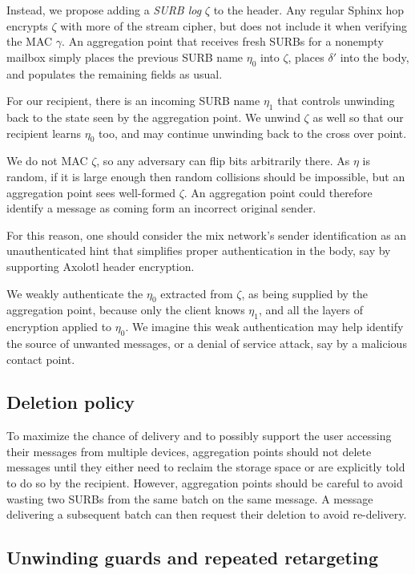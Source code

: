 Instead, we propose adding a {\it SURB log} $\zeta$ to the header.
Any regular Sphinx hop encrypts $\zeta$ with more of the stream
cipher, but does not include it when verifying the MAC $\gamma$.
An aggregation point that receives fresh SURBs for a nonempty
mailbox simply places the previous SURB name $\eta_0$ into $\zeta$,
places $\delta'$ into the body, and populates the remaining fields
as usual.

For our recipient, there is an incoming SURB name $\eta_1$ that 
controls unwinding back to the state seen by the aggregation point.
We unwind $\zeta$ as well so that our recipient learns $\eta_0$ too,
and may continue unwinding back to the cross over point.

We do not MAC $\zeta$, so any adversary can flip bits arbitrarily
there.  As $\eta$ is random, if it is large enough then random
collisions should be impossible, but an aggregation point sees
well-formed $\zeta$.  An aggregation point could therefore identify
a message as coming form an incorrect original sender.

For this reason, one should consider the mix network's sender
identification as an unauthenticated hint that simplifies proper
authentication in the body, say by supporting Axolotl header
encryption.  

We weakly authenticate the $\eta_0$ extracted from $\zeta$,
as being supplied by the aggregation point, because only the client
knows $\eta_1$, and all the layers of encryption applied to $\eta_0$.  
We imagine this weak authentication may help identify the source of
unwanted messages, or a denial of service attack, say by a malicious
contact point.


\subsection{Deletion policy}

To maximize the chance of delivery and to possibly support the user
accessing their messages from multiple devices, aggregation points
should not delete messages until they either need to reclaim the
storage space or are explicitly told to do so by the recipient.
However, aggregation points should be careful to avoid wasting two
SURBs from the same batch on the same message.  A message delivering a
subsequent batch can then request their deletion to avoid re-delivery.


\subsection{Unwinding guards and repeated retargeting}

